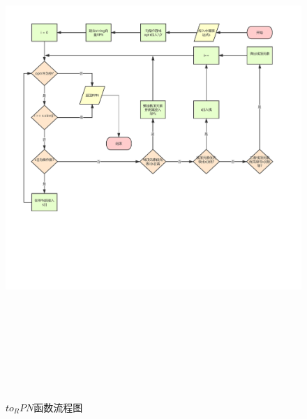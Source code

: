 \documentclass[UTF8]{ctexart}
\begin{document}
\begin{figure}[H]
	\centering 
	\includegraphics[width=20cm, height=19cm]{to_RPN.pdf} 
	\caption{$to_RPN$函数流程图} 
	\label{to RPN}
\end{figure}
\end{document}
